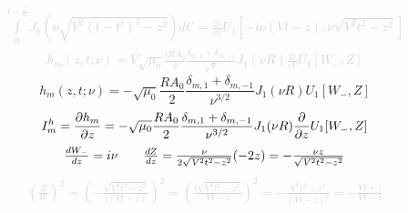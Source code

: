 %
\textcolor{lightgray} { \begin{equation*} \begin{aligned}
\int \limits_{0}^{t - \frac{z}{\mathit{V}}} 
J_0 \left( \nu \sqrt{\mathit{V}^2 (t-t')^2 - z^2} 
\right) dt' = \frac{2i}{\nu \mathit{V}} U_1 
\left[ -i \nu (\mathit{V}t-z), \nu \sqrt{\mathit{V}^2t^2-z^2} \right]
\end{aligned} \end{equation*} }
%
\textcolor{lightgray} { \begin{equation*} \begin{aligned}
h_m (z, t; \nu) = \mathit{V} \sqrt{\mu_0} \frac{iR A_0}{4} 
\frac{\delta_{m,1} + \delta_{m,-1}} {\sqrt{\nu}} J_1 (\nu R) 
\frac{2i}{\nu \mathit{V}} U_1 \left[ W_-, Z \right]
\end{aligned} \end{equation*} }
%
\begin{equation}
h_m (z, t; \nu) = - \sqrt{\mu_0} \frac{R A_0}{2} 
\frac{\delta_{m,1} + \delta_{m,-1}}
{\nu^{3/2}} J_1 (\nu R) U_1 \left[ W_-, Z \right]
\end{equation}
%
\textcolor{lightgray} { \begin{equation*} \begin{aligned}
I_{m}^{h} = \frac{\partial h_m}{\partial z} = 
- \sqrt{\mu_0} \frac{R A_0}{2} 
\frac{\delta_{m,1} + \delta_{m,-1}}
{\nu^{3/2}} J_1 (\nu R) \frac{\partial }{\partial z} U_1 [ W_-, Z ]
\end{aligned} \end{equation*} }
%
\textcolor{lightgray} { \begin{equation*} \begin{aligned}
\begin{array}{lcr}
\frac{d W_-}{d z} = i \nu & &
\frac{d Z}{d z} = \frac{\nu}{2 \sqrt{\mathit{V}^2 t^2 - z^2}} (-2z) = 
- \frac{\nu z}{\sqrt{\mathit{V}^2 t^2 - z^2}} \\
\end{array}
\end{aligned} \end{equation*} }
%
\textcolor{lightgray} { \begin{equation*} \begin{aligned}
\left( \frac{Z}{W} \right)^2 = 
\left( - \frac{ \sqrt{\mathit{V}^2 t^2-z^2}}{i(\mathit{V} t-z)} \right)^2 =
\left( \frac{ i \sqrt{\mathit{V}^2 t^2-z^2}}{\mathit{V}t-z} \right)^2 =
- \frac{\mathit{V}^2 t^2-z^2}{(\mathit{V} t-z)^2} = 
- \frac{\mathit{V}t+z}{\mathit{V}t-z}
\end{aligned} \end{equation*} }
